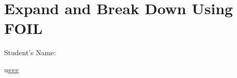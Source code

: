 \documentclass[12pt, a4paper, addpoints]{exam}
\newcommand{\ps}{\vspace{36mm}}
\newcommand{\uggg}{%
    \pgfmathtruncatemacro{\a}{random(2,9)} %
    \pgfmathtruncatemacro{\b}{random(2,9)} %
    \pgfmathtruncatemacro{\c}{random(1,9)} %
    \edef\result{(x + \b)(\a x + \c)}%
    \result
}
\begin{document}
\section*{Expand and Break Down Using FOIL}
\quad Student's Name: \underline{\hspace{5cm}}

\begin{questions}
\LARGE

\question
uggg
\setlength{\columnsep}{20pt}
\begin{multicols}{3}
\begin{parts}
    \part \( \uggg \)
    \ps
       \part \( \uggg \)
    \ps
       \part \( \uggg \)
    \ps
       \part \( \uggg \)
    \ps
       \part \( \uggg \)
    \ps
       \part \( \uggg \)
    \ps
       \part \( \uggg \)
    \ps
       \part \( \uggg \)
    \ps
       \part \( \uggg \)
    \ps
           \part \( \uggg \)
    \ps
           \part \( \uggg \)
    \ps

\end{parts}
\end{multicols}
\end{questions}
\end{document}
